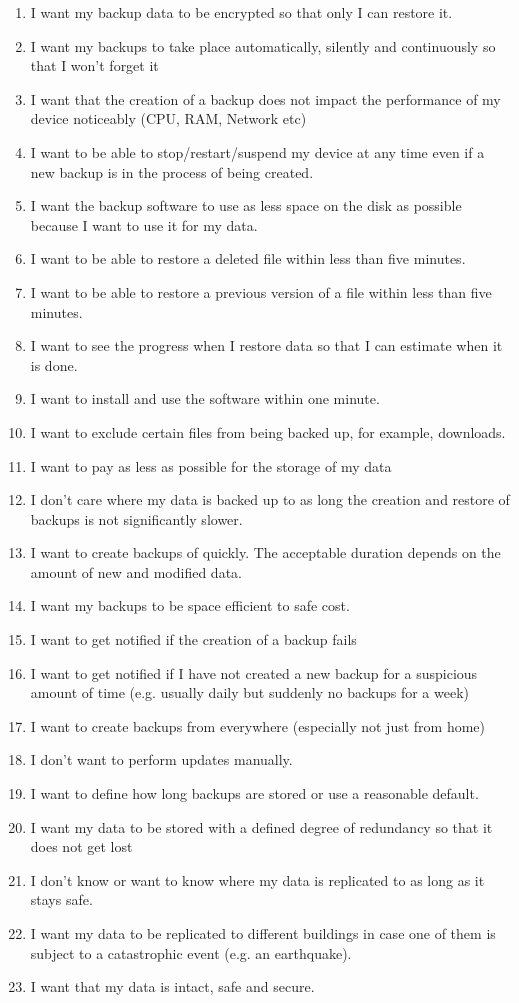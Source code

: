 \begin{enumerate}
	\item
	I want my backup data to be encrypted so that only I can restore it.
	\item
	I want my backups to take place automatically, silently and
	continuously so that I won't forget it
	\item
	I want that the creation of a backup does not impact the performance
	of my device noticeably (CPU, RAM, Network etc)
	\item
	I want to be able to stop/restart/suspend my device at any time even
	if a new backup is in the process of being created.
	\item
	I want the backup software to use as less space on the disk as
	possible because I want to use it for my data.
	\item
	I want to be able to restore a deleted file within less than five
	minutes.
	\item
	I want to be able to restore a previous version of a file within less
	than five minutes.
	\item
	I want to see the progress when I restore data so that I can estimate
	when it is done.
	\item
	I want to install and use the software within one minute.
	\item
	I want to exclude certain files from being backed up, for example,
	downloads.
	\item
	I want to pay as less as possible for the storage of my data
	\item
	I don't care where my data is backed up to as long the creation and
	restore of backups is not significantly slower.
	\item
	I want to create backups of quickly. The acceptable duration depends
	on the amount of new and modified data.
	\item
	I want my backups to be space efficient to safe cost.
	\item
	I want to get notified if the creation of a backup fails
	\item
	I want to get notified if I have not created a new backup for a
	suspicious amount of time (e.g. usually daily but suddenly no backups
	for a week)
	\item
	I want to create backups from everywhere (especially not just from
	home)
	\item
	I don't want to perform updates manually.
	\item
	I want to define how long backups are stored or use a reasonable
	default.
	\item
	I want my data to be stored with a defined degree of redundancy so
	that it does not get lost
	\item
	I don't know or want to know where my data is replicated to as long as
	it stays safe.
	\item
	I want my data to be replicated to different buildings in case one of
	them is subject to a catastrophic event (e.g. an earthquake).
	\item
	I want that my data is intact, safe and secure.
\end{enumerate}

